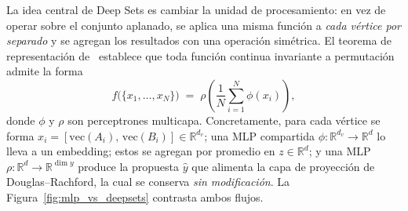 La idea central de Deep Sets es cambiar la unidad de procesamiento: en vez de operar sobre el
conjunto aplanado, se aplica una misma función a \emph{cada vértice por separado} y se agregan
los resultados con una operación simétrica. El teorema de representación
de~\cite{zaheer2017deep} establece que toda función continua invariante a permutación admite
la forma
\begin{equation}
    f\big(\{x_1,\dots,x_N\}\big) \;=\; \rho\!\left( \frac{1}{N}\sum_{i=1}^{N} \phi(x_i) \right),
    \label{eq:deepsets}
\end{equation}
donde $\phi$ y $\rho$ son perceptrones multicapa. Concretamente, para cada vértice se forma
$x_i = [\mathrm{vec}(A_i),\,\mathrm{vec}(B_i)] \in \mathbb{R}^{d_v}$; una MLP compartida
$\phi:\mathbb{R}^{d_v}\!\to\!\mathbb{R}^{d}$ lo lleva a un embedding; estos se agregan por
promedio en $z\in\mathbb{R}^{d}$; y una MLP $\rho:\mathbb{R}^{d}\!\to\!\mathbb{R}^{\dim y}$
produce la propuesta $\hat y$ que alimenta la capa de proyección de Douglas--Rachford, la cual
se conserva \emph{sin modificación}. La Figura~\ref{fig:mlp_vs_deepsets} contrasta ambos
flujos.

